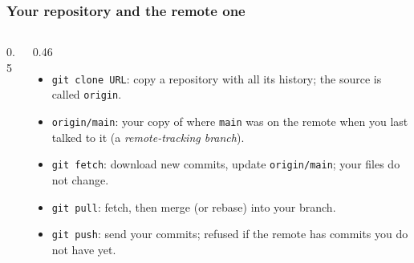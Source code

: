 \documentclass[aspectratio=169,10pt,compress]{beamer}
\begin{document}




\begin{frame}[t,fragile] \frametitle{Your repository and the remote one}
  \begin{columns}[T]
    \begin{column}{0.5\textwidth}
      \begin{center}
      \end{center}
    \end{column}
    \begin{column}{0.46\textwidth}
      \begin{itemize}\small
        \item \texttt{git clone URL}: copy a repository with all its history; the source is called \texttt{origin}.
        \item \texttt{origin/main}: your copy of where \texttt{main} was on the remote when you last talked to it (a \emph{remote-tracking branch}).
        \item \texttt{git fetch}: download new commits, update \texttt{origin/main}; your files do not change.
        \item \texttt{git pull}: fetch, then merge (or rebase) into your branch.
        \item \texttt{git push}: send your commits; refused if the remote has commits you do not have yet.
      \end{itemize}
    \end{column}
  \end{columns}
\end{frame}
\end{document}
